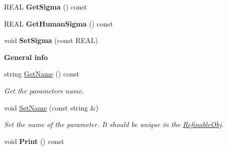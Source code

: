 \begin{Indent}
\begin{DoxyCompactItemize}
\mbox{\label{class_obj_cryst_1_1_refinable_par_a63c12b0d1e021ba1276d15a0ffc8b459}} 
R\+E\+AL {\bfseries Get\+Sigma} () const
\item 
\mbox{\label{class_obj_cryst_1_1_refinable_par_a4bb3d76972870f82d18b437a79f040c0}} 
R\+E\+AL {\bfseries Get\+Human\+Sigma} () const
\item 
\mbox{\label{class_obj_cryst_1_1_refinable_par_af199d90bd14333483929aab3a898ae39}} 
void {\bfseries Set\+Sigma} (const R\+E\+AL)
\end{DoxyCompactItemize}
\end{Indent}
\begin{Indent}\textbf{ General info}\par
\begin{DoxyCompactItemize}
\item 
\mbox{\label{class_obj_cryst_1_1_refinable_par_a1a2acc39d6483283c5361a4b2d0c1fd5}} 
string \mbox{\hyperlink{class_obj_cryst_1_1_refinable_par_a1a2acc39d6483283c5361a4b2d0c1fd5}{Get\+Name}} () const
\begin{DoxyCompactList}\small\item\em Get the parameter\textquotesingle{}s name. \end{DoxyCompactList}\item 
\mbox{\label{class_obj_cryst_1_1_refinable_par_ac8e91083b8d0c3fe1d3f349122756abb}} 
void \mbox{\hyperlink{class_obj_cryst_1_1_refinable_par_ac8e91083b8d0c3fe1d3f349122756abb}{Set\+Name}} (const string \&)
\begin{DoxyCompactList}\small\item\em Set the name of the parameter. It should be unique in the \mbox{\hyperlink{class_obj_cryst_1_1_refinable_obj}{Refinable\+Obj}}. \end{DoxyCompactList}\item 
\mbox{\label{class_obj_cryst_1_1_refinable_par_a13d1107632b06df17009a7d30effb7dc}} 
void {\bfseries Print} () const
\item 
\mbox{\label{class_obj_cryst_1_1_refinable_par_a2e8f1ccb1ad69126d7dc59b2582dec6d}} 

\end{DoxyCompactItemize}
\end{Indent}
